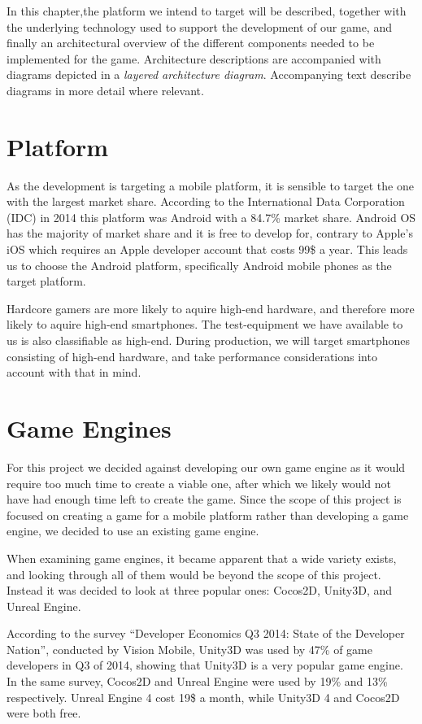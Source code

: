In this chapter,the platform we intend to target will be described, together with the underlying
technology used to support the development of our game, and finally an
architectural overview of the different components needed to be implemented for
the game. Architecture descriptions are accompanied with diagrams depicted in a
\textit{layered architecture diagram}. Accompanying text describe diagrams in
more detail where relevant.

\section{Platform}
As the development is targeting a mobile platform, it is sensible to target the one with the largest market share.
According to the International Data Corporation (IDC) in 2014 this platform was Android with a 84.7\% market share\cite{marketshare}.
Android OS has the majority of market share and it is free to develop
for, contrary to Apple's iOS which requires an Apple developer account that
costs 99\$ a year\cite{appledevprogram}.
This leads us to choose the Android platform, specifically Android mobile
phones as the target platform.

Hardcore gamers are more likely to aquire high-end hardware, and therefore more likely to aquire high-end smartphones.
The test-equipment we have available to us is also classifiable as high-end.
During production, we will target smartphones consisting of high-end hardware, and take performance considerations into account with that in mind.

\section{Game Engines}
For this project we decided against developing our own game engine as it would require too much time to create a viable one, after which we likely would not have had enough time left to create the game. 
Since the scope of this project is focused on creating a game for a mobile platform rather than developing a game engine, we decided to use an existing game engine.

When examining game engines, it became apparent that a wide variety exists, and looking through all of them would be beyond the scope of this project.
Instead it was decided to look at three popular ones: Cocos2D, Unity3D, and Unreal Engine.

According to the survey ``Developer Economics Q3 2014: State of the Developer Nation''\cite{visionmobile-survey}, conducted by Vision Mobile\cite{visionmobile}, Unity3D was used by 47\% of game developers in Q3 of 2014, showing that Unity3D is a very popular game engine. 
In the same survey, Cocos2D and Unreal Engine were used by 19\% and 13\% respectively.
Unreal Engine 4 cost 19\$ a month\cite{unrealFree}, while Unity3D 4 and Cocos2D were both free.

